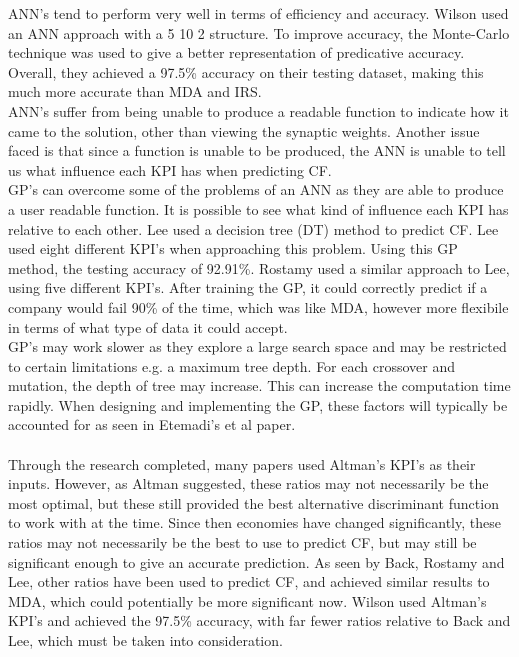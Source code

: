 \documentclass[11pt]{article}
\begin{document}
ANN's tend to perform very well in terms of efficiency and accuracy. Wilson used an ANN approach with a 5 10 2 structure. To improve accuracy, the Monte-Carlo technique was used to give a better representation of predicative accuracy. Overall, they achieved a 97.5\% accuracy on their testing dataset, making this much more accurate than MDA and IRS. \\
ANN's suffer from being unable to produce a readable function to indicate how it came to the solution, other than viewing the synaptic weights. Another issue faced  is that since a function is unable to be produced, the ANN is unable to tell us what influence each KPI has when predicting CF.\\
GP's can overcome some of the problems of an ANN as they are able to produce a user readable function. It is possible to see what kind of influence each KPI has relative to each other. Lee used a decision tree (DT) method to predict CF. Lee used eight different KPI's when approaching this problem. Using this GP method, the testing accuracy of 92.91\%. Rostamy used a similar approach to Lee, using five different KPI's. After training the GP, it could correctly predict if a company would fail 90\% of the time, which was like MDA, however more flexibile in terms of what type of data it could accept. \\
GP's may work slower as they explore a large search space and may be restricted to certain limitations e.g. a maximum tree depth. For each crossover and mutation, the depth of tree may increase. This can increase the computation time rapidly. When designing and implementing the GP, these factors will typically be accounted for as seen in Etemadi's et al paper. \\
\\
Through the research completed, many papers used Altman's KPI's as their inputs. However, as Altman suggested, these ratios may not necessarily be the most optimal, but these still provided the best alternative discriminant function to work with at the time. Since then economies have changed significantly, these ratios may not necessarily be the best to use to predict CF, but may still be significant enough to give an accurate prediction. As seen by Back, Rostamy and Lee, other ratios have been used to predict CF, and achieved similar results to MDA, which could potentially be more significant now. Wilson used Altman's KPI's and achieved the 97.5\% accuracy, with far fewer ratios relative to Back and Lee, which must be taken into consideration.
\end{document}
